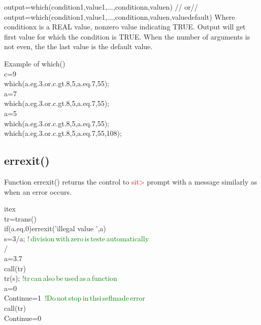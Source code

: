 \begin{itemize}
output=\textcolor{VioletRed}{which}(condition1,value1,...,conditionn,valuen) //
or//
output=\textcolor{VioletRed}{which}(condition1,value1,...,conditionn,valuen,valuedefault)
Where conditionx is a REAL value, nonzero	value indicating TRUE. Output will get first value for which
the condition is TRUE. When the number of arguments is not even, the the last value
is the default value.
\begin{example}[whichex]Example of \textcolor{VioletRed}{which}()\\
\label{whichex}
c=9\\
\textcolor{VioletRed}{which}(a.eg.3.or.c.gt.8,5,a.eq.7,55);\\
a=7\\
\textcolor{VioletRed}{which}(a.eg.3.or.c.gt.8,5,a.eq.7,55);\\
a=5\\
\textcolor{VioletRed}{which}(a.eg.3.or.c.gt.8,5,a.eq.7,55);\\
\textcolor{VioletRed}{which}(a.eg.3.or.c.gt.8,5,a.eq.7,55,108);
\end{example}
\subsection{\textcolor{VioletRed}{errexit}()}
\label{errexit}
Function \textcolor{VioletRed}{errexit}() returns the control to \textcolor{Red}{sit>} prompt with a message similarly
as when an error occurs.

\begin{example}[errexitex]itex\\
\label{errexitex}
tr=\textcolor{VioletRed}{trans}()\\
\textcolor{VioletRed}{if}(a.eq.0)\textcolor{VioletRed}{errexit}('illegal value ',a)\\
s=3/a; \textcolor{green}{!\,division\,with\,zero\,is\,teste\,automatically}\\
/\\
a=3.7\\
\textcolor{VioletRed}{call}(tr)\\
tr(s); \textcolor{green}{!tr\,can\,also\,be\,used\,as\,a\,function}\\
a=0\\
Continue=1 \,\textcolor{green}{!Do\,not\,stop\,in\,thsi\,seflmade\,error}\\
\textcolor{VioletRed}{call}(tr)\\
Continue=0
\end{example}

\end{itemize}
